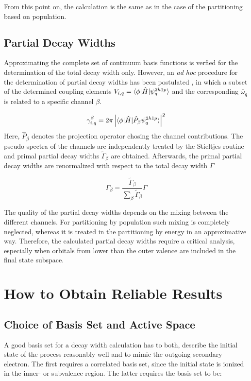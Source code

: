 From this point on, the calculation is the same as in the case of the partitioning
based on population.

\subsection{Partial Decay Widths} \label{section:partial}
Approximating the complete set of continuum basis functions is verfied for
the determination of the total decay width only. However, an \emph{ad hoc} procedure
for the determination of partial decay widths has been postulated \cite{Cacelli86},
in which a subset of the determined coupling elements
$V_{i,q} = \braket{\phi |\hat{H}| \psi_{q}^{2h1p}}$  and the corresponding
$\bar{\omega}_q$ is related to a specific channel $\beta$.

\begin{equation}
 \gamma_{i,q}^{\beta} = 2\pi \left| \braket{\phi| \hat{H} | \hat{P}_\beta \psi_{q}^{2h1p}} 
                    \right|^2
\end{equation}
Here, $\hat{P}_\beta$ denotes the projection operator chosing the channel contributions.
The pseudo-spectra of the channels are independently treated by the Stieltjes
routine and primal partial decay widths $\tilde{\Gamma}_\beta$ are obtained.
Afterwards, the primal partial decay widths
are renormalized with respect to the total decay width $\Gamma$

\begin{equation}
 \Gamma_\beta = \frac{\tilde{\Gamma}_\beta}{\sum_\beta \tilde{\Gamma}_\beta} \Gamma
\end{equation}

The quality of the partial decay widths depends on the mixing between the different
channels. For partitioning by population such mixing is completely neglected, whereas
it is treated in the partitioning by energy in an approximative way. Therefore,
the calculated partial decay widths require a critical analysis, especially when
orbitals from lower than the outer valence are included in the final state subspace.




\section{How to Obtain Reliable Results}
\subsection{Choice of Basis Set and Active Space}
A good basis set for a decay width calculation has to both,
describe the initial state of the process reasonably well and to mimic
the outgoing secondary electron. The first requires a correlated basis set, since
the initial state is ionized in the inner- or subvalence region.
The latter requires the basis set to be:


